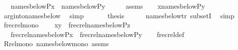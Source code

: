 \begin{isabellebody}
\ \ \ {\isachardoublequoteopen}names{\isacharunderscore}{\kern0pt}below{\isacharparenleft}{\kern0pt}P{\isacharcomma}{\kern0pt}x{\isacharparenright}{\kern0pt}\ {\isasymsubseteq}\ names{\isacharunderscore}{\kern0pt}below{\isacharparenleft}{\kern0pt}P{\isacharcomma}{\kern0pt}y{\isacharparenright}{\kern0pt}{\isachardoublequoteclose}\isanewline
%
\isadelimproof
%
\endisadelimproof
%
\isatagproof
{}\isamarkupfalse%
\ {\isacharminus}{\kern0pt}\isanewline
\ \ \isamarkupfalse%
\ assms\isanewline
\ \ \isamarkupfalse%
\ {\isachardoublequoteopen}x{\isasymin}names{\isacharunderscore}{\kern0pt}below{\isacharparenleft}{\kern0pt}P{\isacharcomma}{\kern0pt}y{\isacharparenright}{\kern0pt}{\isachardoublequoteclose}\isanewline
\ \ \ \ \isamarkupfalse%
\ arg{\isacharunderscore}{\kern0pt}into{\isacharunderscore}{\kern0pt}names{\isacharunderscore}{\kern0pt}below{}\ \isamarkupfalse%
\ simp\isanewline
\ \ \isamarkupfalse%
\isanewline
\ \ \isamarkupfalse%
\ {\isacharquery}{\kern0pt}thesis\isanewline
\ \ \ \ \isamarkupfalse%
\ names{\isacharunderscore}{\kern0pt}below{\isacharunderscore}{\kern0pt}tr\ subsetI\ \isamarkupfalse%
\ simp\isanewline
{}\isamarkupfalse%
%
\endisatagproof
{\isafoldproof}%
%
\isadelimproof
\isanewline
%
\endisadelimproof
\isanewline
{}\isamarkupfalse%
\ frecrel{\isacharunderscore}{\kern0pt}mono\ {\isacharcolon}{\kern0pt}\isanewline
\ \ \ {\isachardoublequoteopen}{\isasymlangle}x{\isacharcomma}{\kern0pt}y{\isasymrangle}\ {\isasymin}\ frecrel{\isacharparenleft}{\kern0pt}names{\isacharunderscore}{\kern0pt}below{\isacharparenleft}{\kern0pt}P{\isacharcomma}{\kern0pt}z{\isacharparenright}{\kern0pt}{\isacharparenright}{\kern0pt}{\isachardoublequoteclose}\isanewline
\ \ \ {\isachardoublequoteopen}frecrel{\isacharparenleft}{\kern0pt}names{\isacharunderscore}{\kern0pt}below{\isacharparenleft}{\kern0pt}P{\isacharcomma}{\kern0pt}x{\isacharparenright}{\kern0pt}{\isacharparenright}{\kern0pt}\ {\isasymsubseteq}\ frecrel{\isacharparenleft}{\kern0pt}names{\isacharunderscore}{\kern0pt}below{\isacharparenleft}{\kern0pt}P{\isacharcomma}{\kern0pt}y{\isacharparenright}{\kern0pt}{\isacharparenright}{\kern0pt}{\isachardoublequoteclose}\isanewline
%
\isadelimproof
\ \ %
\endisadelimproof
%
\isatagproof
{}\isamarkupfalse%
\ frecrel{\isacharunderscore}{\kern0pt}def\isanewline
\ \ \isamarkupfalse%
\ Rrel{\isacharunderscore}{\kern0pt}mono\ names{\isacharunderscore}{\kern0pt}below{\isacharunderscore}{\kern0pt}mono\ assms\ \isamarkupfalse%

\end{isabellebody}
